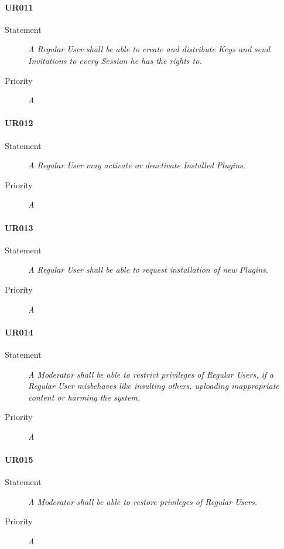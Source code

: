 \paragraph*{UR011}
\begin{description}
  \item [Statement] 
    \textit{A \gls{Regular User} shall be able to create and distribute \gls{Keys} and send \gls{Invitations} to every \gls{Session} he has the rights to.}
  \item [Priority] \textit{A}
\end{description}

\paragraph*{UR012}
\begin{description}
  \item [Statement] 
    \textit{A \gls{Regular User} may activate or deactivate \gls{Installed Plugins}.}
  \item [Priority] \textit{A}
\end{description}

\paragraph*{UR013}
\begin{description}
  \item [Statement] 
    \textit{A \gls{Regular User} shall be able to request installation of new \gls{Plugins}.}
  \item [Priority] \textit{A}
\end{description}

\paragraph*{UR014}
\begin{description}
  \item [Statement] 
    \textit{A \gls{Moderator} shall be able to restrict privileges of \gls{Regular User}s, if a \gls{Regular User} misbehaves like insulting others, uploading inappropriate content or harming the system.}
  \item [Priority] \textit{A}
\end{description}

\paragraph*{UR015}
\begin{description}
  \item [Statement] 
    \textit{A \gls{Moderator} shall be able to restore privileges of \gls{Regular User}s.}
  \item [Priority] \textit{A}
\end{description}

